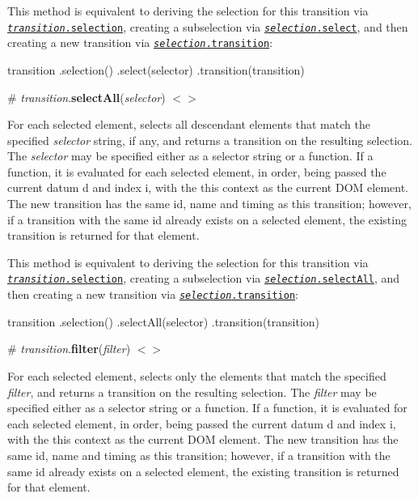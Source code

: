 This method is equivalent to deriving the selection for this transition via \href{#transition_selection}{\tt {\itshape transition}.selection}, creating a subselection via \href{https://github.com/d3/d3-selection#selection_select}{\tt {\itshape selection}.select}, and then creating a new transition via \href{#selection_transition}{\tt {\itshape selection}.transition}\+:


\begin{DoxyCode}
transition
  .selection()
  .select(selector)
  .transition(transition)
\end{DoxyCode}


\label{_transition_selectAll}%
\# {\itshape transition}.{\bfseries select\+All}({\itshape selector}) \href{https://github.com/d3/d3-transition/blob/master/src/transition/selectAll.js}{\tt $<$$>$}

For each selected element, selects all descendant elements that match the specified {\itshape selector} string, if any, and returns a transition on the resulting selection. The {\itshape selector} may be specified either as a selector string or a function. If a function, it is evaluated for each selected element, in order, being passed the current datum {\ttfamily d} and index {\ttfamily i}, with the {\ttfamily this} context as the current D\+OM element. The new transition has the same id, name and timing as this transition; however, if a transition with the same id already exists on a selected element, the existing transition is returned for that element.

This method is equivalent to deriving the selection for this transition via \href{#transition_selection}{\tt {\itshape transition}.selection}, creating a subselection via \href{https://github.com/d3/d3-selection#selection_selectAll}{\tt {\itshape selection}.select\+All}, and then creating a new transition via \href{#selection_transition}{\tt {\itshape selection}.transition}\+:


\begin{DoxyCode}
transition
  .selection()
  .selectAll(selector)
  .transition(transition)
\end{DoxyCode}


\label{_transition_filter}%
\# {\itshape transition}.{\bfseries filter}({\itshape filter}) \href{https://github.com/d3/d3-transition/blob/master/src/transition/filter.js}{\tt $<$$>$}

For each selected element, selects only the elements that match the specified {\itshape filter}, and returns a transition on the resulting selection. The {\itshape filter} may be specified either as a selector string or a function. If a function, it is evaluated for each selected element, in order, being passed the current datum {\ttfamily d} and index {\ttfamily i}, with the {\ttfamily this} context as the current D\+OM element. The new transition has the same id, name and timing as this transition; however, if a transition with the same id already exists on a selected element, the existing transition is returned for that element.

